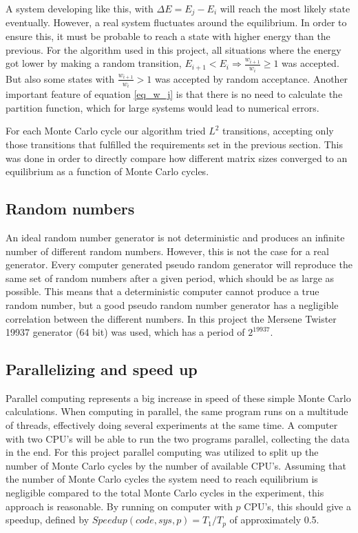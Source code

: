 A system developing like this, with $ \Delta E = E_j - E_i $ will reach the most likely state eventually. However, a real system fluctuates around the equilibrium. In order to ensure this, it must be probable to reach a state with higher energy than the previous. For the algorithm used in this project, all situations where the energy got lower by making a random transition, $E_{i+1}<E_{i} \Rightarrow \frac{w_{i+1}}{w_i}\geq 1 $ was accepted. But also some states with $ \frac{w_{i+1}}{w_i}>1 $ was accepted by random acceptance. Another important feature of equation  \ref{eq_w_j} is that there is no need to calculate the partition function, which for large systems would lead to numerical errors. 


For each Monte Carlo cycle our algorithm tried  $ L^2 $ transitions, accepting only those transitions that fulfilled the requirements set in the previous section. This was done in order to directly compare how different matrix sizes converged to an equilibrium as a function of Monte Carlo cycles. 


\subsection{Random numbers}
An ideal random number generator is not deterministic and produces an infinite number of different random numbers. However, this is not the case for a real generator. Every computer generated pseudo random generator will reproduce the same set of random numbers after a given period, which should be as large as possible. This means that a deterministic computer cannot produce a true random number, but a good pseudo random number generator has  a negligible  correlation between the different numbers. In this project the Mersene Twister 19937 generator (64 bit)
was used, which has a period of $ 2^{19937} $.


\subsection{Parallelizing and speed up }
	Parallel computing represents a big increase in speed of these simple Monte Carlo calculations. When computing in parallel, the same program runs on a multitude of threads, effectively doing several experiments at the same time. A computer with two CPU's will be able to run the two programs parallel, collecting the data in the end. For this project parallel computing was utilized to split up the number of Monte Carlo cycles by the number of available CPU's. Assuming that the number of Monte Carlo cycles the system need to reach equilibrium is negligible compared to the total Monte Carlo cycles in the experiment, this approach is reasonable. By running on computer with $ p $ CPU's, this should give a speedup, defined by $Speedup(code,sys,p) = T_1/T_p$ of approximately 0.5.  
	
